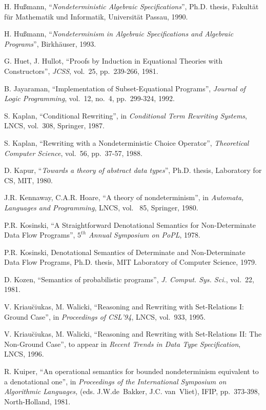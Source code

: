  H. Hu{\ss}mann, ``{\em Nondeterministic Algebraic 
Specifications}'', Ph.D. thesis, Fakult\"{a}t f\"{u}r Mathematik und 
Informatik, Universit\"{a}t Passau, 1990.

 H. Hu{\ss}mann, ``{\em Nondeterminism in Algebraic 
Specifications and Algebraic Programs}'', Birkh\"{a}user, 1993.

 G. Huet, J. Hullot, ``Proofs by Induction in Equational 
Theories with Constructors'', {\em JCSS}, vol.~25, pp.~239-266, 1981.

 B. Jayaraman, ``Implementation of Subset-Equational 
Programs'', {\em Journal of Logic Programming}, vol.~12, no.~4, pp.~299-324, 
1992.

 S. Kaplan, ``Conditional Rewriting'', in {\em 
Conditional Term Rewriting Systems}, LNCS, vol.~308, Springer, 1987.

 S. Kaplan, ``Rewriting with a Nondeterministic Choice 
Operator'', {\em Theoretical Computer Science}, vol.~56, pp.~37-57, 1988.

 D. Kapur, ``{\em Towards a theory of abstract data 
types}'', Ph.D. thesis, Laboratory for CS, MIT, 1980.

 J.R. Kennaway, C.A.R. Hoare, ``A theory of 
nondeterminism'', in {\em Automata, Languages and Programming}, LNCS, vol.~
85, Springer, 1980.

 P.R. Kosinski, ``A Straightforward Denotational 
Semantics for Non-Determinate Data Flow Programs'', {\em $5^{th}$ Annual 
Symposium on PoPL}, 1978.

 P.R. Kosinski, Denotational Semantics of Determinate and 
Non-Determinate Data Flow Programs, Ph.D. thesis, MIT Laboratory of 
Computer Science, 1979.

 D. Kozen, ``Semantics of probabilistic programs'', {\em 
J. Comput.  Sys.  Sci.}, vol.~22, 1981.

 V. Kriau\u{c}iukas, M. Walicki, ``Reasoning and 
Rewriting with Set-Relations I: Ground Case'', in {\em Proceedings of 
CSL'94}, LNCS, vol.~933, 1995.

 V. Kriau\u{c}iukas, M. Walicki, ``Reasoning and 
Rewriting with Set-Relations II: The Non-Ground Case'', to appear in {\em 
Recent Trends in Data Type Specification}, LNCS, 1996.

 R. Kuiper, ``An operational semantics for bounded 
nondeterminism equivalent to a denotational one'', in {\em Proceedings of 
the International Symposium on Algorithmic Languages,} 
(eds. J.W.de~Bakker, J.C. van~Vliet), IFIP,  pp.~373-398, North-Holland, 1981.

